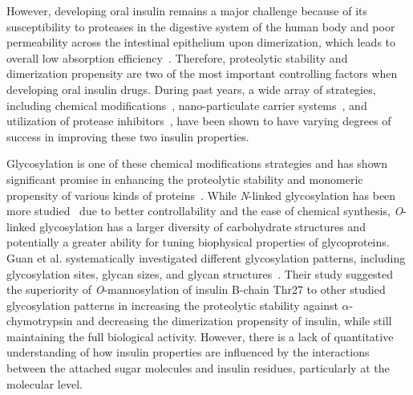 \documentclass[9pt]{elife}
\begin{document}
However, developing oral insulin remains a major challenge because of its susceptibility to proteases in the digestive system of the human body and poor permeability across the intestinal epithelium upon dimerization, which leads to overall low absorption efficiency~\cite{bruno2013basics}. Therefore, proteolytic stability and dimerization propensity are two of the most important controlling factors when developing oral insulin drugs. During past years, a wide array of strategies, including chemical modifications~\cite{hinds2002effects, clement2002oral}, nano-particulate carrier systems~\cite{deng2017selenium, bhattacharyya2017preparation, zhou2020nanocomposite}, and utilization of protease inhibitors~\cite{agarwal2000oral}, have been shown to have varying degrees of success in improving these two insulin properties. 

Glycosylation is one of these chemical modifications strategies and has shown significant promise in enhancing the proteolytic stability and monomeric propensity of various kinds of proteins~\cite{kayser2011glycosylation, raju2006glycosylation,russell2009site}. While \emph{N}-linked glycosylation has been more studied~\cite{losev2019novel,van2004role, sareneva1995n} due to better controllability and the ease of chemical synthesis, \emph{O}-linked glycosylation has a larger diversity of carbohydrate structures and potentially a greater ability for tuning biophysical properties of glycoproteins. Guan et al. systematically investigated different glycosylation patterns, including glycosylation sites, glycan sizes, and glycan structures~\cite{guan2018chemically}. Their study suggested the superiority of \emph{O}-mannosylation of insulin B-chain Thr27 to other studied glycosylation patterns in increasing the proteolytic stability against $\alpha$-chymotrypsin and decreasing the dimerization propensity of insulin, while still maintaining the full biological activity. However, there is a lack of quantitative understanding of how insulin properties are influenced by the interactions between the attached sugar molecules and insulin residues, particularly at the molecular level. 
\end{document}

